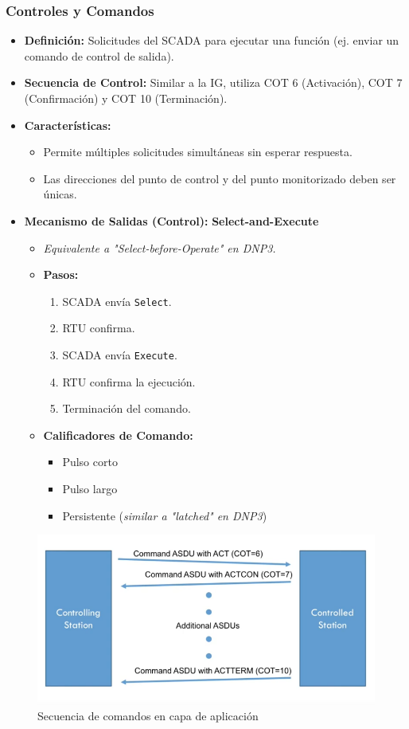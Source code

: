 \documentclass[a5paper]{book}%
\begin{document}
\subsubsection{Controles y Comandos}
\begin{itemize}
	\item \textbf{Definición:} Solicitudes del SCADA para ejecutar una función (ej. enviar un comando de control de salida).
	\item \textbf{Secuencia de Control:} Similar a la IG, utiliza COT 6 (Activación), COT 7 (Confirmación) y COT 10 (Terminación).
	\item \textbf{Características:}
	\begin{itemize}
		\item Permite múltiples solicitudes simultáneas sin esperar respuesta.
		\item Las direcciones del punto de control y del punto monitorizado deben ser únicas.
	\end{itemize}
	\item \textbf{Mecanismo de Salidas (Control):} \textbf{Select-and-Execute}
	\begin{itemize}
		\item \textit{Equivalente a "Select-before-Operate" en DNP3.}
		\item \textbf{Pasos:}
		\begin{enumerate}
			\item SCADA envía \texttt{Select}.
			\item RTU confirma.
			\item SCADA envía \texttt{Execute}.
			\item RTU confirma la ejecución.
			\item Terminación del comando.
		\end{enumerate}
		\item \textbf{Calificadores de Comando:}
		\begin{itemize}
			\item Pulso corto
			\item Pulso largo
			\item Persistente (\textit{similar a "latched" en DNP3})
		\end{itemize}
	\end{itemize}
\end{itemize}

\begin{figure}[H]
	\centering
	\caption{Secuencia de comandos en capa de aplicación}
	\label{fig:comandos104}
	\includegraphics[width=1\linewidth]{comandos_104}
\end{figure}
\end{document}

